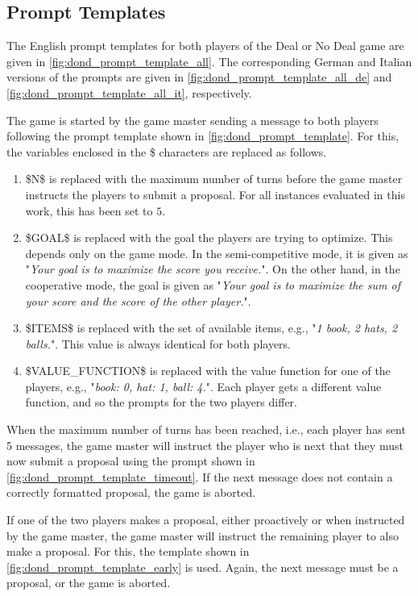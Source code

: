 \documentclass[../main.tex]{subfiles}
\begin{document}
\subsection{Prompt Templates}\label{sec:dond_prompt_templates}

The English prompt templates for both players of the Deal or No Deal game are given in \cref{fig:dond_prompt_template_all}. The corresponding German and Italian versions of the prompts are given in \cref{fig:dond_prompt_template_all_de} and \cref{fig:dond_prompt_template_all_it}, respectively.

The game is started by the game master sending a message to both players following the prompt template shown in \cref{fig:dond_prompt_template}. For this, the variables enclosed in the \$ characters are replaced as follows.
\begin{enumerate}
  \item \$N\$ is replaced with the maximum number of turns before the game master instructs the players to submit a proposal. For all instances evaluated in this work, this has been set to $5$.
  \item \$GOAL\$ is replaced with the goal the players are trying to optimize. This depends only on the game mode. In the semi-competitive mode, it is given as "\emph{Your goal is to maximize the score you receive.}". On the other hand, in the cooperative mode, the goal is given as "\emph{Your goal is to maximize the sum of your score and the score of the other player.}".
  \item \$ITEMS\$ is replaced with the set of available items, e.g., "\emph{1 book, 2 hats, 2 balls.}". This value is always identical for both players.
  \item \$VALUE\_FUNCTION\$ is replaced with the value function for one of the players, e.g., "\emph{book: 0, hat: 1, ball: 4.}". Each player gets a different value function, and so the prompts for the two players differ.
\end{enumerate}

When the maximum number of turns has been reached, i.e., each player has sent 5 messages, the game master will instruct the player who is next that they must now submit a proposal using the prompt shown in \cref{fig:dond_prompt_template_timeout}. If the next message does not contain a correctly formatted proposal, the game is aborted.

If one of the two players makes a proposal, either proactively or when instructed by the game master, the game master will instruct the remaining player to also make a proposal. For this, the template shown in \cref{fig:dond_prompt_template_early} is used. Again, the next message must be a proposal, or the game is aborted. 
\end{document}
